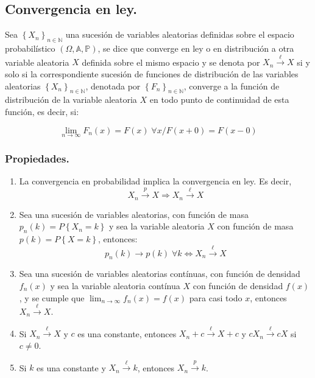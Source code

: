 \subsection{Convergencia en ley.}
\begin{definicion}
Sea $ \left\{X_n\right\}_{n\in\mathbb{N}}$ una sucesi\'on de variables aleatorias definidas sobre el espacio probabil\'istico $\left(\Omega,\mathbb{A}, \mathbb{P}\right) $, se dice que converge en ley o en distribuci\'on a otra variable aleatoria $X$ definida sobre el mismo espacio y se denota por $X_{n} \overset{\ell}{\to} X $ si y solo si la correspondiente sucesi\'on de funciones de distribuci\'on de las variables aleatorias $ \left\{X_n\right\}_{n\in\mathbb{N}}$, denotada por $ \left\{F_n\right\}_{n\in\mathbb{N}} $, converge a la funci\'on de distribuci\'on de la variable aleatoria $X$ en todo punto de continuidad de esta funci\'on, es  decir, si:

\begin{equation}
\lim_{n\to\infty}F_n(x)=F(x)\;\forall x/F(x+0)=F(x-0)
\end{equation}

\end{definicion}

\subsubsection{Propiedades.}

\begin{enumerate}
\item 
\begin{teorema}
    La convergencia en probabilidad implica la convergencia en ley. Es decir, 
     \begin{equation}
X_{n} \overset{p}{\to} X \Rightarrow X_{n} \overset{\ell}{\to} X
\end{equation}
\end{teorema}
\item 
\begin{teorema}
    Sea una sucesi\'on de variables aleatorias, con funci\'on de masa $p_n(k)=P\left\{X_n=k\right\}$ y sea la variable aleatoria $X$ con funci\'on de masa $p(k)=P\left\{X=k\right\}$, entonces:
     \begin{equation}
p_{n}(k)\to p(k)\;\forall k \Leftrightarrow X_{n} \overset{\ell}{\to} X
\end{equation}
\end{teorema}
\item 
\begin{teorema}
    Sea una sucesi\'on de variables aleatorias cont\'inuas, con funci\'on de densidad $f_n(x)$ y sea la variable aleatoria cont\'inua $X$ con funci\'on de densidad $f(x)$, y se cumple que $\lim_{n\to\infty}f_n(x)=f(x)$ para casi todo $x$, entonces $X_{n} \overset{\ell}{\to} X$.
\end{teorema}
\item  Si $X_{n} \overset{\ell}{\to} X $ y $c$ es una constante, entonces $X_{n}+c \overset{\ell}{\to} X+c $ y $cX_{n} \overset{\ell}{\to} cX $ si $c\neq0$.
\item  Si $k$ es una constante y $X_{n} \overset{\ell}{\to} k $, entonces $X_{n} \overset{p}{\to} k $.
\end{enumerate}

